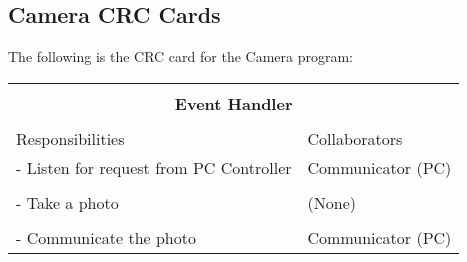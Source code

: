 \documentclass[titlepage]{article}
\begin{document}
\subsection{Camera CRC Cards}
The following is the CRC card for the Camera program:\\
\begin{table}[!htbp]
\centering
\begin{tabular}{| p{} | p{} |}\hline
	\multicolumn{2}{|l|}{}\\
	\multicolumn{2}{|c|}{\large{\textbf{Event Handler}}}\\
	\multicolumn{2}{|l|}{}\\\hline
	\vspace{0mm}\large{Responsibilities}\vspace{2mm} &\vspace{0mm}\large{Collaborators}\vspace{2mm}\\\hline
	\vspace{0mm}- Listen for request from PC Controller	&\vspace{0mm}Communicator (PC)\\&\\
	- Take a photo										&(None)\\&\\
	- Communicate the photo\vspace{2mm}					&Communicator (PC)\vspace{2mm}\\\hline
\end{tabular}
\end{table}
\end{document}
